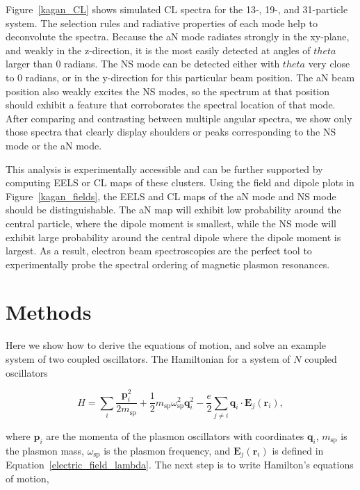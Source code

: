 \documentclass[journal=apchd5,manuscript=article]{achemso}
\begin{document}
Figure~\ref{kagan_CL} shows simulated CL spectra for the 13-, 19-, and 31-particle system. The selection rules and radiative properties of each mode help to deconvolute the spectra. Because the aN mode radiates strongly in the xy-plane, and weakly in the z-direction, it is the most easily detected at angles of $theta$ larger than 0 radians. The NS mode can be detected either with $theta$ very close to 0 radians, or in the y-direction for this particular beam position. The aN beam position also weakly excites the NS modes, so the spectrum at that position should exhibit a feature that corroborates the spectral location of that mode. After comparing and contrasting between multiple angular spectra,  we show only those spectra that clearly display shoulders or peaks corresponding to the NS mode or the aN mode.

This analysis is experimentally accessible and can be further supported by computing EELS or CL maps of these clusters. Using the field and dipole plots in Figure~\ref{kagan_fields}, the EELS and CL maps of the aN mode and NS mode should be distinguishable. The aN map will exhibit low probability around the central particle, where the dipole moment is smallest, while the NS mode will exhibit large probability around the central dipole where the dipole moment is largest. As a result, electron beam spectroscopies are the perfect tool to experimentally probe the spectral ordering of magnetic plasmon resonances.

\section{Methods}
Here we show how to derive the equations of motion, and solve an example system of two coupled oscillators. The Hamiltonian for a system of $N$ coupled oscillators

\begin{equation}
H = \sum_{i}\frac{\textbf{p}_i^2}{2m_{\textrm{sp}}}+\frac{1}{2}m_{\textrm{sp}}\omega_{\textrm{sp}}^2\textbf{q}_i^2 - \frac{e}{2}\sum_{j\neq i}\textbf{q}_i\cdot\textbf{E}_j(\textbf{r}_i),
\label{hammy}
\end{equation}

\noindent where $\textbf{p}_i$ are the momenta of the plasmon oscillators with coordinates $\textbf{q}_i$, $m_{\textrm{sp}}$ is the plasmon mass, $\omega_{\textrm{sp}}$ is the plasmon frequency, and $\textbf{E}_j(\textbf{r}_i)$ is defined in Equation~\ref{electric_field_lambda}. The next step is to write Hamilton's equations of motion,
\end{document}
